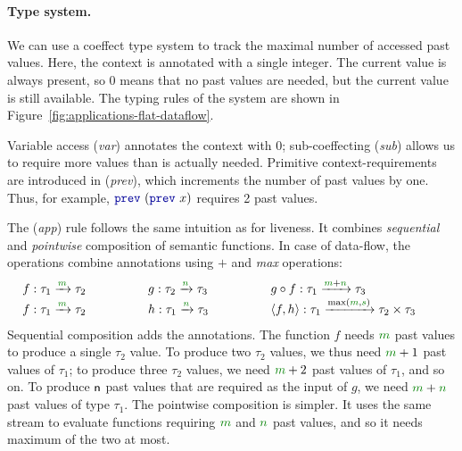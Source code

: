 
\paragraph{Type system.}
We can use a coeffect type system to track the maximal number of accessed past values. Here,
the context is annotated with a single integer. The current value is always present, so $0$ means 
that no past values are needed, but the current value is still available. The typing rules of 
the system are shown in Figure~\ref{fig:applications-flat-dataflow}.

Variable access (\emph{var}) annotates the context with $0$; sub-coeffecting (\emph{sub}) allows
us to require more values than is actually needed. Primitive context-requirements are introduced
in (\emph{prev}), which increments the number of past values by one. Thus, for example, 
$\kvd{prev}~(\kvd{prev}~x)$ requires 2 past values.

The (\emph{app}) rule follows the same intuition as for liveness. It combines \emph{sequential} 
and \emph{pointwise} composition of semantic functions. In case of data-flow, the operations
combine annotations using $+$ and \emph{max} operations:
%
\begin{equation*}
\begin{array}{lll}
f : \tau_1 \xrightarrow{\cclrd{m}} \tau_2 \qquad\qquad&
g : \tau_2 \xrightarrow{\cclrd{n}} \tau_3 \qquad\qquad&
g \circ f : \tau_1 \xrightarrow{\cclrd{m} + \cclrd{n}} \tau_3 \qquad\qquad
\\
f : \tau_1 \xrightarrow{\cclrd{m}} \tau_2 \qquad\qquad&
h : \tau_1 \xrightarrow{\cclrd{n}} \tau_3 \qquad\qquad&
\langle f, h \rangle : \tau_1 \xrightarrow{\textnormal{max}(\cclrd{m}, \cclrd{s})} \tau_2 \times \tau_3 \qquad
\end{array}
\end{equation*}
%
Sequential composition adds the annotations. The function $f$ needs $\cclrd{m}$ past values to 
produce a single $\tau_2$ value. To produce two $\tau_2$ values, we thus need $\cclrd{m}+1$ past
values of $\tau_1$; to produce three $\tau_2$ values, we need $\cclrd{m}+2$ past values of $\tau_1$,
and so on. To produce $\textnormal{\sffamily n}$ past values that are required as the input of $g$, we need
$\cclrd{m}+\cclrd{n}$ past values of type $\tau_1$. The pointwise composition is simpler. It uses
the same stream to evaluate functions requiring $\cclrd{m}$ and $\cclrd{n}$ past values, and so it
needs maximum of the two at most.

